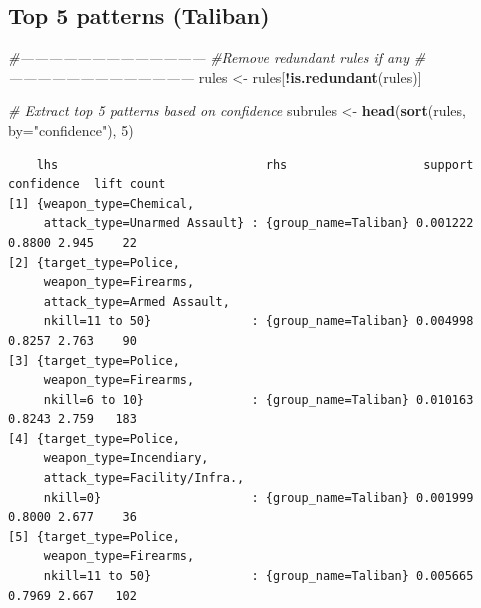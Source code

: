 \documentclass[11pt,oneside,a4paper]{reedthesis}
\newenvironment{Shaded}{\begin{snugshade}}{\end{snugshade}}
\newcommand{\KeywordTok}[1]{\textcolor[rgb]{0.13,0.29,0.53}{\textbf{#1}}}
\newcommand{\DataTypeTok}[1]{\textcolor[rgb]{0.13,0.29,0.53}{#1}}
\newcommand{\DecValTok}[1]{\textcolor[rgb]{0.00,0.00,0.81}{#1}}
\newcommand{\StringTok}[1]{\textcolor[rgb]{0.31,0.60,0.02}{#1}}
\newcommand{\CommentTok}[1]{\textcolor[rgb]{0.56,0.35,0.01}{\textit{#1}}}
\newcommand{\OperatorTok}[1]{\textcolor[rgb]{0.81,0.36,0.00}{\textbf{#1}}}
\newcommand{\NormalTok}[1]{#1}
\begin{document}
\subsection{Top 5 patterns (Taliban)}\label{top-5-patterns-taliban}
\begin{Shaded}
\begin{Highlighting}[]
\CommentTok{#---------------------------------------}
\CommentTok{#Remove redundant rules if any}
\CommentTok{#---------------------------------------}
\NormalTok{rules <-}\StringTok{ }\NormalTok{rules[}\OperatorTok{!}\KeywordTok{is.redundant}\NormalTok{(rules)]}

\CommentTok{# Extract top 5 patterns based on confidence}
\NormalTok{subrules <-}\StringTok{ }\KeywordTok{head}\NormalTok{(}\KeywordTok{sort}\NormalTok{(rules, }\DataTypeTok{by=}\StringTok{"confidence"}\NormalTok{), }\DecValTok{5}\NormalTok{)}
\end{Highlighting}
\end{Shaded}
\pagebreak
\begin{verbatim}
    lhs                             rhs                   support confidence  lift count
[1] {weapon_type=Chemical,                                                              
     attack_type=Unarmed Assault} : {group_name=Taliban} 0.001222     0.8800 2.945    22
[2] {target_type=Police,                                                                
     weapon_type=Firearms,                                                              
     attack_type=Armed Assault,                                                         
     nkill=11 to 50}              : {group_name=Taliban} 0.004998     0.8257 2.763    90
[3] {target_type=Police,                                                                
     weapon_type=Firearms,                                                              
     nkill=6 to 10}               : {group_name=Taliban} 0.010163     0.8243 2.759   183
[4] {target_type=Police,                                                                
     weapon_type=Incendiary,                                                            
     attack_type=Facility/Infra.,                                                       
     nkill=0}                     : {group_name=Taliban} 0.001999     0.8000 2.677    36
[5] {target_type=Police,                                                                
     weapon_type=Firearms,                                                              
     nkill=11 to 50}              : {group_name=Taliban} 0.005665     0.7969 2.667   102
\end{verbatim}
\end{document}
